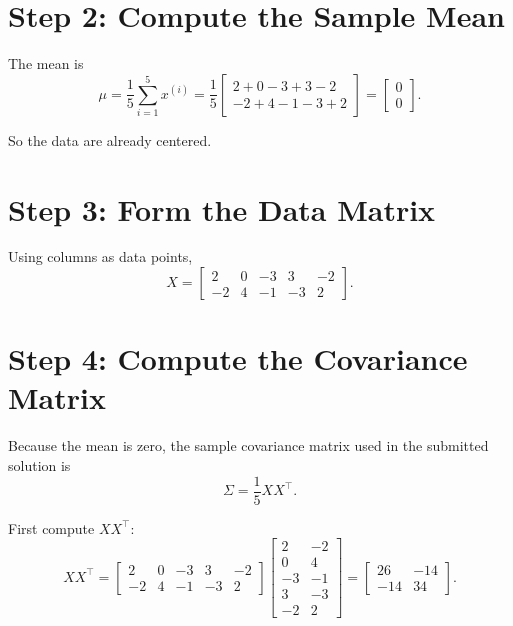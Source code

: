 \documentclass[11pt]{article}
\begin{document}
\section*{Step 2: Compute the Sample Mean}

The mean is
\[
    \mu
    =
    \frac{1}{5}
    \sum_{i=1}^5 x^{(i)}
    =
    \frac{1}{5}
    \begin{bmatrix}
        2+0-3+3-2\\
        -2+4-1-3+2
    \end{bmatrix}
    =
    \begin{bmatrix}
        0\\
        0
    \end{bmatrix}.
\]

So the data are already centered.

\section*{Step 3: Form the Data Matrix}

Using columns as data points,
\[
    X
    =
    \begin{bmatrix}
        2 & 0 & -3 & 3 & -2\\
        -2 & 4 & -1 & -3 & 2
    \end{bmatrix}.
\]

\section*{Step 4: Compute the Covariance Matrix}

Because the mean is zero, the sample covariance matrix used in the submitted
solution is
\[
    \Sigma = \frac{1}{5}XX^\top.
\]

First compute \(XX^\top\):
\[
    XX^\top
    =
    \begin{bmatrix}
        2 & 0 & -3 & 3 & -2\\
        -2 & 4 & -1 & -3 & 2
    \end{bmatrix}
    \begin{bmatrix}
        2 & -2\\
        0 & 4\\
        -3 & -1\\
        3 & -3\\
        -2 & 2
    \end{bmatrix}
    =
    \begin{bmatrix}
        26 & -14\\
        -14 & 34
    \end{bmatrix}.
\]
\end{document}
